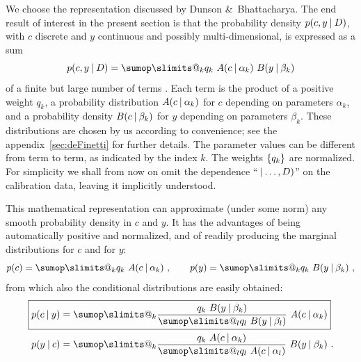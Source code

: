 \documentclass[a4paper,12pt,%
onecolumn,oneside,article,%
british%
]{memoir}
\makeatletter
\def\sum{\DOTSI\sumop\slimits@}
\newcommand*{\amp}{\&}
\DeclarePairedDelimiter\set{\{}{\}} %
\renewcommand*{\|}[1][]{\nonscript\:#1\vert\nonscript\:\mathopen{}}
\makeatother
\begin{document}
We choose the representation discussed by Dunson \amp\ Bhattacharya\autocites{dunsonetal2011}[see also the special case discussed by][]{rasmussen1999}. The end result of interest in the present section is that the probability density $p(c,y \| D)$, with $c$ discrete and $y$ continuous and possibly multi-dimensional, is expressed as a sum
\begin{equation}
  \label{eq:representation_P}
  p(c, y \| D) = \sum_{k} q_{k}\ A(c \| \alpha_{k})\ B(y \| \beta_{k})
\end{equation}
of a finite but large number of terms \autocites[see][on why the number of terms does not need to be infinite]{ishwaranetal2002b}. Each term is the product of a positive weight $q_{k}$, a probability distribution $A(c \| \alpha_{k})$ for $c$ depending on parameters $\alpha_{k}$, and a probability density $B(c \| \beta_{k})$ for $y$ depending on parameters $\beta_{k}$. These distributions are chosen by us according to convenience; see the appendix~\ref{sec:deFinetti} for further details. The parameter values can be different from term to term, as indicated by the index $k$. The weights $\set{q_{k}}$ are normalized. For simplicity we shall from now on omit the dependence \enquote{$\|\dotsc, D)$} on the calibration data, leaving it implicitly understood.

This mathematical representation can approximate (under some norm) any smooth probability density in $c$ and $y$. It has the advantages of being automatically positive and normalized, and of readily producing the marginal distributions for $c$ and for $y$:
\begin{equation}
  \label{eq:marginals}
  p(c) = \sum_{k} q_{k}\ A(c \| \alpha_{k})\ ,
  \qquad
  p(y) = \sum_{k} q_{k}\ B(y \| \beta_{k}) \ ,
\end{equation}
from which also the conditional distributions are easily obtained:
\begin{subequations} \label{eq:conditionals}
  \begin{align}
    \label{eq:conditional_c_given_y}
  \Aboxed{  p(c \| y) &= \sum_{k} \frac{q_{k}\ B(y \| \beta_{k})
                }{\sum_{l} q_{l}\ B(y \| \beta_{l})}\
                A(c \| \alpha_{k})}
    \\
    \label{eq:conditional_y_given_c}
    p(y \| c) &= \sum_{k} \frac{q_{k}\ A(c \| \alpha_{k})
                }{\sum_{l} q_{l}\ A(c \| \alpha_{l})}\
                B(y \| \beta_{k}) \ .
  \end{align}
\end{subequations}
\end{document}

